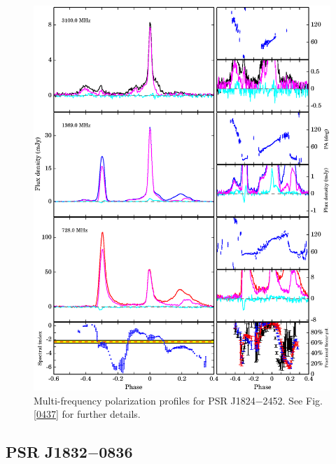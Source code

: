 \documentclass[useAMS,usenatbib]{mn2e}
\begin{document}

\begin{figure}
\begin{center}
\includegraphics[width=6 in]{1824.ps}
\caption{Multi-frequency polarization profiles for PSR J1824$-$2452. 
See Fig. \ref{0437} for further details.}
\label{1824}
\end{center}
\end{figure}

\subsection{PSR J1832$-$0836}
\end{document}
